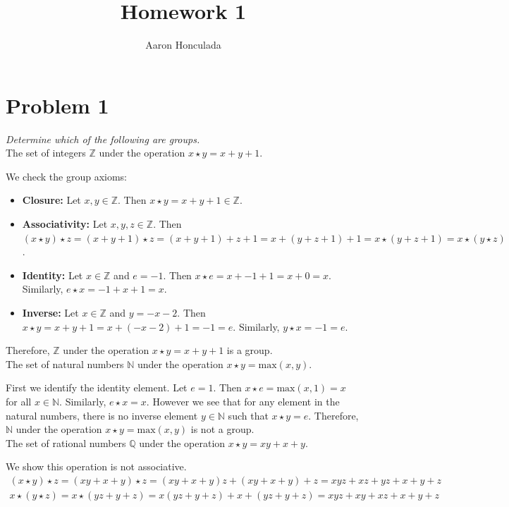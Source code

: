 \documentclass{article}
\title{Homework 1}
\author{Aaron Honculada}
\date{\monthname[\month] \the\year}
\theoremstyle{plain} %
\theoremstyle{definition} %
\begin{document}
\maketitle

\section*{Problem 1}
\noindent\textit{Determine which of the following are groups.}\\
\noindent{} The set of integers $\mathbb{Z}$ under the operation $x \star y = x + y + 1$.

We check the group axioms:
\begin{itemize}
    \item \textbf{Closure:} Let $x,y \in \mathbb{Z}$. Then $x \star y = x + y + 1 \in \mathbb{Z}$.
    \item \textbf{Associativity:} Let $x,y,z \in \mathbb{Z}$. Then $(x \star y) \star z = (x + y + 1) \star z = (x + y + 1) + z + 1 = 
        x + (y + z + 1) + 1 = x \star (y + z + 1) = x \star (y \star z)$.
    \item \textbf{Identity:} Let $x \in \mathbb{Z}$ and $e = -1$. Then $x \star e = x + -1 + 1 = x + 0 = x$. Similarly,
    $e \star x = -1 + x + 1 = x$.
    \item \textbf{Inverse:} Let $x \in \mathbb{Z}$ and $y = -x-2$. Then $x \star y = x + y + 1 = x + (-x-2) + 1 = -1 = e$.
        Similarly, $y \star x = -1 = e$.
\end{itemize}
Therefore, $\mathbb{Z}$ under the operation $x \star y = x + y + 1$ is a group.
\\

\noindent{} The set of natural numbers $\mathbb{N}$ under the operation $x \star y = \text{max}(x,y)$.

First we identify the identity element. Let $e = 1$. Then $x \star e = \text{max}(x,1) = x$ for all $x \in \mathbb{N}$.
Similarly, $e \star x = x$.
However we see that for any element in the natural numbers, there is no inverse element $y \in \mathbb{N}$ such that $x \star y = e$.
Therefore, $\mathbb{N}$ under the operation $x \star y = \text{max}(x,y)$ is not a group.
\\

\noindent{} The set of rational numbers $\mathbb{Q}$ under the operation $x \star y = xy + x + y$.

We show this operation is not associative. 
\begin{align*}
    (x \star y) \star z = (xy + x + y) \star z = (xy + x + y)z + (xy + x + y) + z = xyz + xz + yz + x + y + z
\end{align*}
\begin{align*}
    x \star (y \star z) = x \star (yz + y + z) = x(yz + y + z) + x + (yz + y + z) = xyz + xy + xz + x + y + z
\end{align*}
\end{document}
